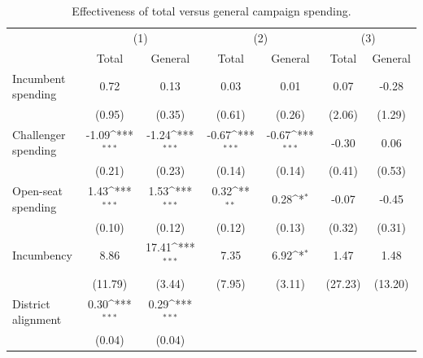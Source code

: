\documentclass{article}
\begin{document}
\begin{table}
\centering
\def\sym#1{\ifmmode^{#1}\else\(^{#1}\)\fi}
\caption{Effectiveness of total versus general campaign spending. \label{table:reg}}
\begin{tabular}{l*{6}{c}}
\toprule
                    &\multicolumn{2}{c}{(1)}&\multicolumn{2}{c}{(2)}&\multicolumn{2}{c}{(3)}\\
                    &\multicolumn{1}{c}{Total}&\multicolumn{1}{c}{General}&\multicolumn{1}{c}{Total}&\multicolumn{1}{c}{General}&\multicolumn{1}{c}{Total}&\multicolumn{1}{c}{General}\\
\midrule
Incumbent spending  &        0.72         &        0.13         &        0.03         &        0.01         &        0.07         &       -0.28         \\
                    &      (0.95)         &      (0.35)         &      (0.61)         &      (0.26)         &      (2.06)         &      (1.29)         \\
\addlinespace
Challenger spending &       -1.09\sym{***}&       -1.24\sym{***}&       -0.67\sym{***}&       -0.67\sym{***}&       -0.30         &        0.06         \\
                    &      (0.21)         &      (0.23)         &      (0.14)         &      (0.14)         &      (0.41)         &      (0.53)         \\
\addlinespace
Open-seat spending  &        1.43\sym{***}&        1.53\sym{***}&        0.32\sym{**} &        0.28\sym{*}  &       -0.07         &       -0.45         \\
                    &      (0.10)         &      (0.12)         &      (0.12)         &      (0.13)         &      (0.32)         &      (0.31)         \\
\addlinespace
Incumbency          &        8.86         &       17.41\sym{***}&        7.35         &        6.92\sym{*}  &        1.47         &        1.48         \\
                    &     (11.79)         &      (3.44)         &      (7.95)         &      (3.11)         &     (27.23)         &     (13.20)         \\
\addlinespace
District alignment  &        0.30\sym{***}&        0.29\sym{***}&                     &                     &                     &                     \\
                    &      (0.04)         &      (0.04)         &                     &                     &                     &                     \\

\end{tabular}
\end{table}
\end{document}
